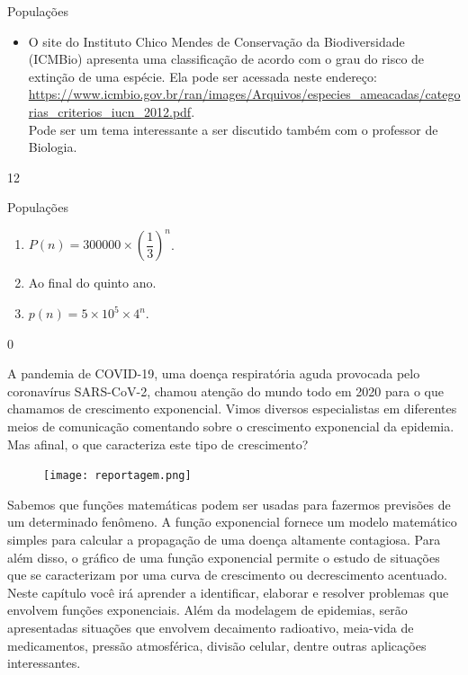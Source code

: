 \begin{sugestions}{Populações}
{
	\begin{itemize}
	\item O site do Instituto Chico Mendes de Conservação da Biodiversidade (ICMBio) apresenta uma classificação de acordo com o grau do risco de extinção de uma espécie. Ela pode ser acessada neste endereço: \url{https://www.icmbio.gov.br/ran/images/Arquivos/especies_ameacadas/categorias_criterios_iucn_2012.pdf}.\\ Pode ser um tema interessante a ser discutido também com o professor de Biologia.
	\end{itemize}
}{1}{2}
\end{sugestions}
\begin{answer}{Populações}
{
	\begin{enumerate}

	\item{}
	$P(n)=300000 \times \left(\dfrac{1}{3}\right)^{n}$.

	\item{}
	Ao final do quinto ano.

	\item{}
	$p(n)=5 \times10^{5} \times 4^{n}$.

	\end{enumerate}
}{0}
\end{answer}


A pandemia de COVID-19, uma doença respiratória aguda provocada pelo coronavírus SARS-CoV-2, chamou atenção do mundo todo em 2020 para o que chamamos de crescimento exponencial. Vimos diversos especialistas em diferentes meios de comunicação comentando sobre o crescimento exponencial da epidemia. Mas afinal, o que caracteriza este tipo de crescimento?

\begin{figure}[H]
\centering
\texttt{[image: reportagem.png]}
\end{figure}


Sabemos que funções matemáticas podem ser usadas para fazermos previsões de um determinado fenômeno. A função exponencial fornece um modelo matemático simples para calcular a propagação de uma doença altamente contagiosa. Para além disso, o gráfico de uma função exponencial permite o estudo de situações que se caracterizam por uma curva de crescimento ou decrescimento acentuado. Neste capítulo você irá aprender a identificar, elaborar e resolver problemas que envolvem funções exponenciais. Além da modelagem de epidemias, serão apresentadas situações que envolvem decaimento radioativo, meia-vida de medicamentos, pressão atmosférica, divisão celular, dentre outras aplicações interessantes.


